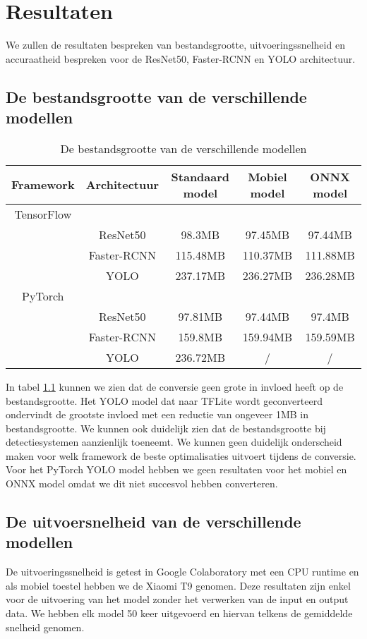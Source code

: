 \chapter{Resultaten}
We zullen de resultaten bespreken van bestandsgrootte, uitvoeringssnelheid en accuraatheid bespreken voor de ResNet50, Faster-RCNN en YOLO architectuur.

\section{De bestandsgrootte van de verschillende modellen}
\begin{table}[!ht]
    \caption{De bestandsgrootte van de verschillende modellen}
\begin{tabular}{ccccc}
    \hline
    Framework & Architectuur & Standaard model & Mobiel model & ONNX model \\
    \hline
    TensorFlow & & & \\
     & ResNet50 & 98.3MB & 97.45MB & 97.44MB \\
     & Faster-RCNN & 115.48MB & 110.37MB & 111.88MB \\
     & YOLO & 237.17MB & 236.27MB & 236.28MB \\
    PyTorch & & & \\
     & ResNet50 & 97.81MB & 97.44MB & 97.4MB \\
     & Faster-RCNN & 159.8MB & 159.94MB & 159.59MB \\
     & YOLO & 236.72MB & / & / \\
    \hline
\end{tabular}
\label{tab:size}
\end{table}

In tabel \ref{tab:size} kunnen we zien dat de conversie geen grote in invloed heeft op de bestandsgrootte.
Het YOLO model dat naar TFLite wordt geconverteerd ondervindt de grootste invloed met een reductie van ongeveer 1MB in bestandsgrootte.
We kunnen ook duidelijk zien dat de bestandsgrootte bij detectiesystemen aanzienlijk toeneemt.
We kunnen geen duidelijk onderscheid maken voor welk framework de beste optimalisaties uitvoert tijdens de conversie.
Voor het PyTorch YOLO model hebben we geen resultaten voor het mobiel en ONNX model omdat we dit niet succesvol hebben converteren.

\section{De uitvoersnelheid van de verschillende modellen}
De uitvoeringssnelheid is getest in Google Colaboratory met een CPU runtime en als mobiel toestel hebben we de Xiaomi T9 genomen.
Deze resultaten zijn enkel voor de uitvoering van het model zonder het verwerken van de input en output data.
We hebben elk model 50 keer uitgevoerd en hiervan telkens de gemiddelde snelheid genomen.

